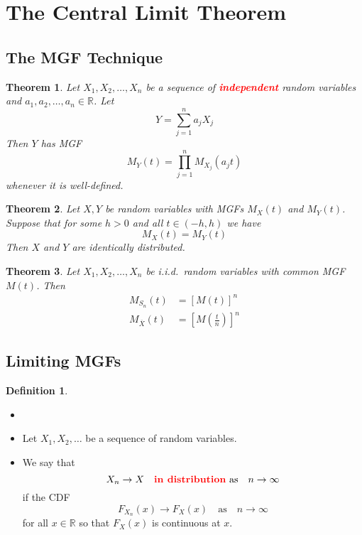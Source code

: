 \documentclass{article}
\newcommand{\R}{\mathbb{R}}
\newcommand{\bfred}[1]{\textcolor{red}{\textbf{#1}}}
\theoremstyle{plain}
\newtheorem{thm}{Theorem}[section]
\theoremstyle{definition}
\newtheorem{defn}{Definition}[section]
\theoremstyle{remark}
\begin{document}
\section{The Central Limit Theorem}

\subsection{The MGF Technique}

\begin{thm}
    Let $X_1,X_2,\dotsc,X_n$ be a sequence of \bfred{independent} random variables and $a_1,a_2,\dotsc,a_n\in\R$. Let 
    \[Y=\sum_{j=1}^na_jX_j\] Then $Y$ has MGF \[M_Y(t)=\prod_{j=1}^nM_{X_j}(a_jt)\] whenever it is well-defined.
\end{thm}

\begin{thm}
    Let $X,Y$ be random variables with MGFs $M_X(t)$ and $M_Y(t)$. Suppose that for some $h>0$ and all $t\in(-h,h)$ we have \[M_X(t)=M_Y(t)\] Then $X$ and $Y$ are identically distributed.
\end{thm}

\begin{thm}
    Let $X_1,X_2,\dotsc,X_n$ be i.i.d.\ random variables with common MGF $M(t)$. Then
    \begin{align*}
        M_{S_n}(t)&=[M(t)]^n\\
        M_{\overline{X}}(t)&=[M(\textstyle\frac{t}{n})]^n
    \end{align*}
\end{thm}

\subsection{Limiting MGFs}

\begin{defn}
    \begin{itemize}
        \item []
        \item Let $X_1,X_2,\dotsc$ be a sequence of random variables.
        \item We say that \[X_n\rightarrow X\quad\text{\bfred{in distribution} as} \quad n\rightarrow\infty\] if the CDF \[F_{X_n}(x)\rightarrow F_X(x)\quad \text{as} \quad n\rightarrow\infty\] for all $x\in\R$ so that $F_X(x)$ is continuous at $x$.
    \end{itemize}
\end{defn}
\end{document}

